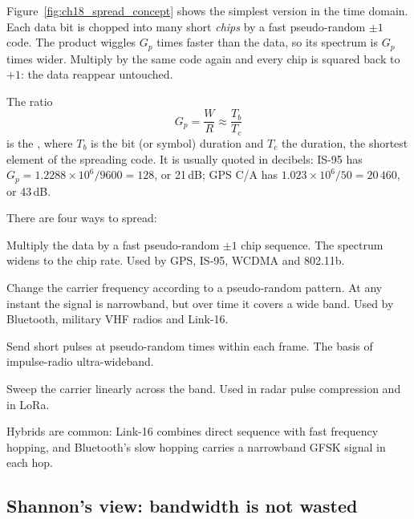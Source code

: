 Figure~\ref{fig:ch18_spread_concept} shows the simplest version in the time domain. Each data
bit is chopped into many short \emph{chips} by a fast pseudo-random $\pm1$ code. The product
wiggles $G_p$ times faster than the data, so its spectrum is $G_p$ times wider. Multiply by the
same code again and every chip is squared back to $+1$: the data reappear untouched.


The ratio
\begin{equation}
G_p=\frac{W}{R}\approx\frac{T_b}{T_c}
\label{eq:ch18:gp}
\end{equation}
is the , where $T_b$ is the bit (or symbol) duration and $T_c$ the
 duration, the shortest element of the spreading code. It is usually quoted in
decibels: IS-95 has $G_p=1.2288\times10^6/9600=128$, or 21\,dB; GPS C/A has
$1.023\times10^6/50=20\,460$, or 43\,dB.

There are four ways to spread:
\begin{description}[style=nextline,leftmargin=1.2em,font=\sffamily\bfseries\small\color{navy}]
\item[Direct sequence (DSSS).] Multiply the data by a fast pseudo-random $\pm1$ chip
sequence. The spectrum widens to the chip rate. Used by GPS, IS-95, WCDMA and 802.11b.
\item[Frequency hopping (FHSS).] Change the carrier frequency according to a pseudo-random
pattern. At any instant the signal is narrowband, but over time it covers a wide band. Used
by Bluetooth, military VHF radios and Link-16.
\item[Time hopping.] Send short pulses at pseudo-random times within each frame. The basis of
impulse-radio ultra-wideband.
\item[Chirp spread spectrum.] Sweep the carrier linearly across the band. Used in radar pulse
compression and in LoRa.
\end{description}
Hybrids are common: Link-16 combines direct sequence with fast frequency hopping, and
Bluetooth's slow hopping carries a narrowband GFSK signal in each hop.

\subsection{Shannon's view: bandwidth is not wasted}

